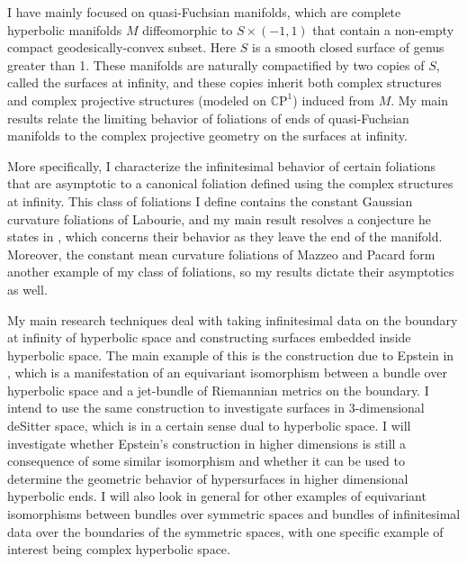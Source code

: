 \documentclass[11pt]{amsart}
\newcommand{\CP}{\mathbb{C}\mathrm{P}}
\begin{document}
I have mainly focused on quasi-Fuchsian manifolds, which are complete hyperbolic manifolds $M$ diffeomorphic to $S \times (-1,1)$ that contain a non-empty compact geodesically-convex subset. 
Here $S$ is a smooth closed surface of genus greater than 1. 
These manifolds are naturally compactified by two copies of $S$, called the surfaces at infinity, and these copies inherit both complex structures and complex projective structures (modeled on $\CP^1$) induced from $M$.
My main results relate the limiting behavior of foliations of ends of quasi-Fuchsian manifolds to the complex projective geometry on the surfaces at infinity.

More specifically, I characterize the infinitesimal behavior of certain foliations that are asymptotic to a canonical foliation defined using the complex structures at infinity. 
This class of foliations I define contains the constant Gaussian curvature foliations of Labourie, and my main result resolves a conjecture he states in \cite{labourie1992}, which concerns their behavior as they leave the end of the manifold. 
Moreover, the constant mean curvature foliations of Mazzeo and Pacard \cite{mazzeo-pacard2011} form another example of my class of foliations, so my results dictate their asymptotics as well.

My main research techniques deal with taking infinitesimal data on the boundary at infinity of hyperbolic space and constructing surfaces embedded inside hyperbolic space. 
The main example of this is the construction due to Epstein in \cite{epstein1984}, which is a manifestation of an equivariant isomorphism between a bundle over hyperbolic space and a jet-bundle of Riemannian metrics on the boundary. 
I intend to use the same construction to investigate surfaces in 3-dimensional deSitter space, which is in a certain sense dual to hyperbolic space. 
I will investigate whether Epstein's construction in higher dimensions is still a consequence of some similar isomorphism and whether it can be used to determine the geometric behavior of hypersurfaces in higher dimensional hyperbolic ends.
I will also look in general for other examples of equivariant isomorphisms between bundles over symmetric spaces and bundles of infinitesimal data over the boundaries of the symmetric spaces, with one specific example of interest being complex hyperbolic space.
\end{document}
